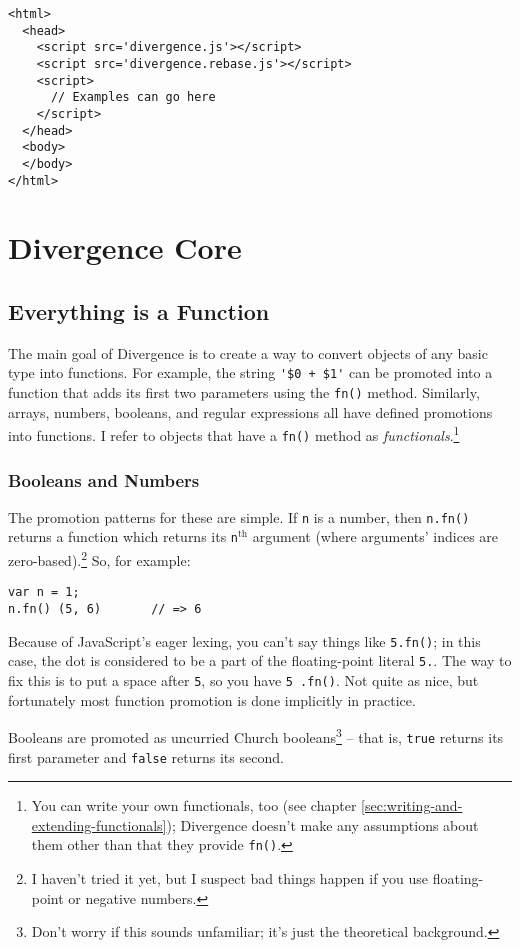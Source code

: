 \documentclass{report}
\begin{document}
\begin{verbatim}
<html>
  <head>
    <script src='divergence.js'></script>
    <script src='divergence.rebase.js'></script>
    <script>
      // Examples can go here
    </script>
  </head>
  <body>
  </body>
</html>
\end{verbatim}

\part {Divergence Core}
\chapter {Everything is a Function}
    The main goal of Divergence is to create a way to convert objects of any basic type into functions. For example, the string \verb|'$0 + $1'| can be promoted into a function that adds its
    first two parameters using the \verb|fn()| method. Similarly, arrays, numbers, booleans, and regular expressions all have defined promotions into functions. I refer to objects that have a
    \verb|fn()| method as {\em functionals}.\footnote{You can write your own functionals, too (see chapter \ref{sec:writing-and-extending-functionals}); Divergence doesn't make any assumptions
    about them other than that they provide {\tt fn()}.}

\section {Booleans and Numbers}
      The promotion patterns for these are simple. If \verb|n| is a number, then \verb|n.fn()| returns a function which returns its \verb|n|$^\textrm{th}$ argument (where arguments' indices are
      zero-based).\footnote{I haven't tried it yet, but I suspect bad things happen if you use floating-point or negative numbers.} So, for example:

\begin{verbatim}
var n = 1;
n.fn() (5, 6)       // => 6
\end{verbatim}

      Because of JavaScript's eager lexing, you can't say things like \verb|5.fn()|; in this case, the dot is considered to be a part of the floating-point literal \verb|5.|. The way to fix this
      is to put a space after \verb|5|, so you have \verb|5 .fn()|. Not quite as nice, but fortunately most function promotion is done implicitly in practice.

      Booleans are promoted as uncurried Church booleans\footnote{Don't worry if this sounds unfamiliar; it's just the theoretical background.} -- that is, \verb|true| returns its first
      parameter and \verb|false| returns its second.
\end{document}
